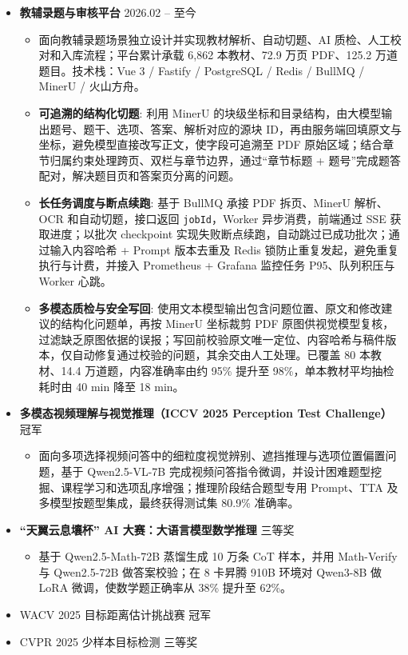 \documentclass[zh]{resume}
\begin{document}
\newpage
{}
\begin{itemize}
  \item \textbf{教辅录题与审核平台} \hfill 2026.02 -- 至今
  \begin{itemize}
    \item 面向教辅录题场景独立设计并实现教材解析、自动切题、AI 质检、人工校对和入库流程；平台累计承载 6,862 本教材、72.9 万页 PDF、125.2 万道题目。技术栈：Vue 3 / Fastify / PostgreSQL / Redis / BullMQ / MinerU / 火山方舟。
    \item \textbf{可追溯的结构化切题}: 利用 MinerU 的块级坐标和目录结构，由大模型输出题号、题干、选项、答案、解析对应的源块 ID，再由服务端回填原文与坐标，避免模型直接改写正文，使字段可追溯至 PDF 原始区域；结合章节归属约束处理跨页、双栏与章节边界，通过``章节标题 + 题号''完成题答配对，解决题目页和答案页分离的问题。
    \item \textbf{长任务调度与断点续跑}: 基于 BullMQ 承接 PDF 拆页、MinerU 解析、OCR 和自动切题，接口返回 \texttt{jobId}，Worker 异步消费，前端通过 SSE 获取进度；以批次 checkpoint 实现失败断点续跑，自动跳过已成功批次；通过输入内容哈希 + Prompt 版本去重及 Redis 锁防止重复发起，避免重复执行与计费，并接入 Prometheus + Grafana 监控任务 P95、队列积压与 Worker 心跳。
    \item \textbf{多模态质检与安全写回}: 使用文本模型输出包含问题位置、原文和修改建议的结构化问题单，再按 MinerU 坐标裁剪 PDF 原图供视觉模型复核，过滤缺乏原图依据的误报；写回前校验原文唯一定位、内容哈希与稿件版本，仅自动修复通过校验的问题，其余交由人工处理。已覆盖 80 本教材、14.4 万道题，内容准确率由约 95\% 提升至 98\%，单本教材平均抽检耗时由 40 min 降至 18 min。
  \end{itemize}
\end{itemize}

\begin{itemize}
  \item \textbf{多模态视频理解与视觉推理（ICCV 2025 Perception Test Challenge）} \hfill 冠军
  \begin{itemize}
    \item 面向多项选择视频问答中的细粒度视觉辨别、遮挡推理与选项位置偏置问题，基于 Qwen2.5-VL-7B 完成视频问答指令微调，并设计困难题型挖掘、课程学习和选项乱序增强；推理阶段结合题型专用 Prompt、TTA 及多模型按题型集成，最终获得测试集 80.9\% 准确率。
  \end{itemize}

  \item \textbf{``天翼云息壤杯'' AI 大赛：大语言模型数学推理} \hfill 三等奖
  \begin{itemize}
    \item 基于 Qwen2.5-Math-72B 蒸馏生成 10 万条 CoT 样本，并用 Math-Verify 与 Qwen2.5-72B 做答案校验；在 8 卡昇腾 910B 环境对 Qwen3-8B 做 LoRA 微调，使数学题正确率从 38\% 提升至 62\%。
  \end{itemize}
  \item WACV 2025 目标距离估计挑战赛 \hfill 冠军
  \item CVPR 2025 少样本目标检测 \hfill 三等奖
\end{itemize}
\end{document}
